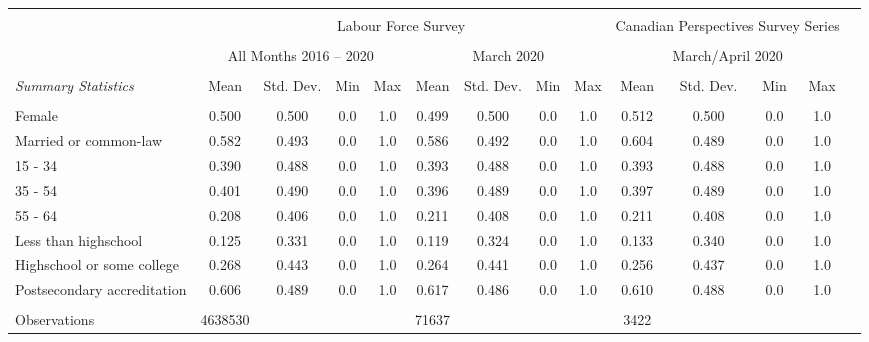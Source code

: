 \begin{tabular*}{\hsize}{ @{\extracolsep{\fill}}l*{13}{c}}
\hline\hline
\\
 &\multicolumn{8}{c}{Labour Force Survey} &\multicolumn{4}{c}{Canadian Perspectives Survey Series} \\
\cline{2-9} \cline{10-13}\\
&\multicolumn{4}{c}{All Months 2016 -- 2020}   &\multicolumn{4}{c}{March 2020} &\multicolumn{4}{c}{March/April 2020} \\ 
\cline{2-5} \cline{6-9} \\
\textit{Summary Statistics} 
                                                  &Mean&Std. Dev.& Min& Max&Mean&Std. Dev.& Min& Max&Mean&Std. Dev.& Min& Max\\
\hline
\\
\hspace{0.5cm}Female                                            &0.500&0.500& 0.0& 1.0&0.499&0.500& 0.0& 1.0&0.512&0.500& 0.0& 1.0\\[0.25em]
\hspace{0.5cm}Married or common-law                             &0.582&0.493& 0.0& 1.0&0.586&0.492& 0.0& 1.0&0.604&0.489& 0.0& 1.0\\[0.25em]
\hspace{0.5cm}15 - 34                                           &0.390&0.488& 0.0& 1.0&0.393&0.488& 0.0& 1.0&0.393&0.488& 0.0& 1.0\\[0.25em]
\hspace{0.5cm}35 - 54                                           &0.401&0.490& 0.0& 1.0&0.396&0.489& 0.0& 1.0&0.397&0.489& 0.0& 1.0\\[0.25em]
\hspace{0.5cm}55 - 64                                           &0.208&0.406& 0.0& 1.0&0.211&0.408& 0.0& 1.0&0.211&0.408& 0.0& 1.0\\[0.25em]
\hspace{0.5cm}Less than highschool                              &0.125&0.331& 0.0& 1.0&0.119&0.324& 0.0& 1.0&0.133&0.340& 0.0& 1.0\\[0.25em]
\hspace{0.5cm}Highschool or some college                        &0.268&0.443& 0.0& 1.0&0.264&0.441& 0.0& 1.0&0.256&0.437& 0.0& 1.0\\[0.25em]
\hspace{0.5cm}Postsecondary accreditation                       &0.606&0.489& 0.0& 1.0&0.617&0.486& 0.0& 1.0&0.610&0.488& 0.0& 1.0\\
\\
Observations                                      &4638530&    &    &    &71637&    &    &    &3422&    &    &    \\
\hline \hline
\end{tabular*}
